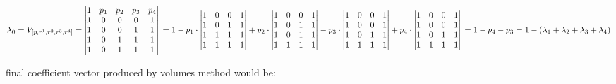 		
	\begin{flushleft}
			\begin{equation}
		
					\lambda_0 =	V_{[p,r^1,r^2,r^3,r^4]} = 
					\begin{vmatrix}
						1 & p_{1} &  p_{2}& p_{3} & p_{4}\\
						1 & 0 & 0 & 0 & 1\\ 
						1 & 0 & 0 & 1 & 1\\ 
						1 &  0  & 1 & 1 & 1 \\ 
						1 & 0 & 1 & 1 & 1
						\end{vmatrix} \\  \\ 
						
						= 1 - p_1 \cdot \begin{vmatrix} 1 & 0 & 0 & 1 \\ 1 & 0 & 1 & 1 \\ 1 & 1 & 1 & 1 \\ 1 & 1 & 1 & 1 \\ \end{vmatrix} + 
						p_2 \cdot \begin{vmatrix} 1 & 0 & 0 & 1 \\ 1 & 0 & 1 & 1 \\ 1 & 0 & 1 & 1 \\ 1 & 1 & 1 & 1 \\ \end{vmatrix} - 
						p_3 \cdot \begin{vmatrix} 1 & 0 & 0 & 1 \\ 1 & 0 & 0 & 1 \\ 1 & 0 & 1 & 1 \\ 1 & 1 & 1 & 1 \\ \end{vmatrix} + 
						p_4 \cdot \begin{vmatrix} 1 & 0 & 0 & 1 \\ 1 & 0 & 0 & 1 \\ 1 & 0 & 1 & 1 \\ 1 & 1 & 1 & 1 \\ \end{vmatrix} \\ \\ 
						= 1 - p_4 - p_3 = 1 - (\lambda_1 + \lambda_2 + \lambda_3 + \lambda_4)

		\end{equation}
	\end{flushleft}
		
		
		final coefficient vector produced by volumes method would be:
		
